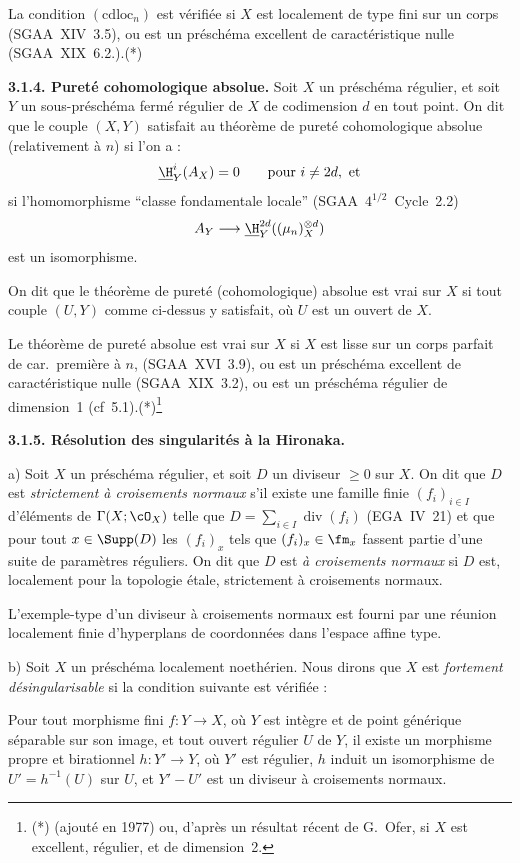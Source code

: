 La condition $(\mathrm{cdloc}_n)$ est vérifiée si $X$ est localement de type fini sur un corps (SGAA~XIV~3.5), ou est un préschéma excellent de caractéristique nulle (SGAA~XIX~6.2.).(*)

\textbf{3.1.4. Pureté cohomologique absolue.} Soit $X$ un préschéma régulier, et soit $Y$ un sous-préschéma fermé régulier de $X$ de codimension $d$ en tout point. On dit que le couple $(X,Y)$ satisfait au théorème de pureté cohomologique absolue (relativement à $n$) si l'on a :
\[
\underline{\H}^i_Y(A_X) = 0 \qquad \text{pour } i \neq 2d, \text{ et}
\]
si l'homomorphisme ``classe fondamentale locale'' (SGAA~$4^{1/2}$~Cycle~2.2)
\[
A_Y \longrightarrow \underline{\H}^{2d}_Y((\mu_n)^{\otimes d}_X)
\]
est un isomorphisme.

On dit que le théorème de pureté (cohomologique) absolue est vrai sur $X$ si tout couple $(U,Y)$ comme ci-dessus y satisfait, où $U$ est un ouvert de $X$.

Le théorème de pureté absolue est vrai sur $X$ si $X$ est lisse sur un corps parfait de car.~première à $n$, (SGAA~XVI~3.9), ou est un préschéma excellent de caractéristique nulle (SGAA~XIX~3.2), ou est un préschéma régulier de dimension~1 (cf~5.1).(*)\footnote{(*) (ajouté en 1977) ou, d'après un résultat récent de G.~Ofer, si $X$ est excellent, régulier, et de dimension~2.}

\textbf{3.1.5. Résolution des singularités à la Hironaka.}

a) Soit $X$ un préschéma régulier, et soit $D$ un diviseur $\geqslant 0$ sur $X$. On dit que $D$ est \emph{strictement à croisements normaux} s'il existe une famille finie $(f_i)_{i \in I}$ d'éléments de $\Gamma(X; \cO_X)$ telle que $D = \sum_{i \in I} \operatorname{div}(f_i)$ (EGA~IV~21) et que pour tout $x \in \Supp(D)$ les $(f_i)_x$ tels que $(f_i)_x \in \fm_x$ fassent partie d'une suite de paramètres réguliers. On dit que $D$ est \emph{à croisements normaux} si $D$ est, localement pour la topologie étale, strictement à croisements normaux.

L'exemple-type d'un diviseur à croisements normaux est fourni par une réunion localement finie d'hyperplans de coordonnées dans l'espace affine type.

b) Soit $X$ un préschéma localement noethérien. Nous dirons que $X$ est \emph{fortement désingularisable} si la condition suivante est vérifiée :

Pour tout morphisme fini $f : Y \to X$, où $Y$ est intègre et de point générique séparable sur son image, et tout ouvert régulier $U$ de $Y$, il existe un morphisme propre et birationnel $h : Y' \to Y$, où $Y'$ est régulier, $h$ induit un isomorphisme de $U' = h^{-1}(U)$ sur $U$, et $Y' - U'$ est un diviseur à croisements normaux.

